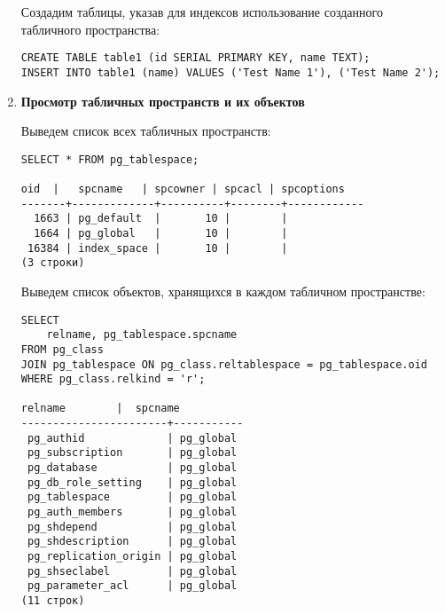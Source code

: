 \begin{enumerate}
Создадим таблицы, указав для индексов использование созданного табличного пространства:

\begin{verbatim}
CREATE TABLE table1 (id SERIAL PRIMARY KEY, name TEXT);
INSERT INTO table1 (name) VALUES ('Test Name 1'), ('Test Name 2');
\end{verbatim}

\item \textbf{Просмотр табличных пространств и их объектов}

Выведем список всех табличных пространств:

\begin{verbatim}
SELECT * FROM pg_tablespace;

oid  |   spcname   | spcowner | spcacl | spcoptions
-------+-------------+----------+--------+------------
  1663 | pg_default  |       10 |        |
  1664 | pg_global   |       10 |        |
 16384 | index_space |       10 |        |
(3 строки)
\end{verbatim}

Выведем список объектов, хранящихся в каждом табличном пространстве:

\begin{verbatim}
SELECT
    relname, pg_tablespace.spcname
FROM pg_class
JOIN pg_tablespace ON pg_class.reltablespace = pg_tablespace.oid
WHERE pg_class.relkind = 'r';

relname        |  spcname
-----------------------+-----------
 pg_authid             | pg_global
 pg_subscription       | pg_global
 pg_database           | pg_global
 pg_db_role_setting    | pg_global
 pg_tablespace         | pg_global
 pg_auth_members       | pg_global
 pg_shdepend           | pg_global
 pg_shdescription      | pg_global
 pg_replication_origin | pg_global
 pg_shseclabel         | pg_global
 pg_parameter_acl      | pg_global
(11 строк)
\end{verbatim}

\end{enumerate}